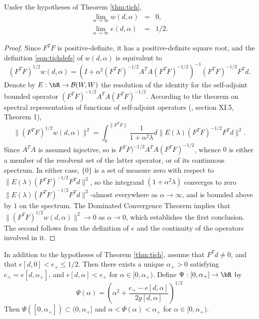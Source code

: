 \begin{proposition}
  \label{thm:alphainf}
  Under the hypotheses of Theorem \ref{thm:tich}, 
  \begin{eqnarray}
  \label{eqn:walphainf}
  \lim_{\alpha \rightarrow \infty} w(d,\alpha) & = & 0,\\
  \label{eqn:ealphainf} 
  \lim_{\alpha \rightarrow \infty} e(d,\alpha) & = & 1/2.
  \end{eqnarray}
\end{proposition}
\begin{proof}
  Since $F^TF$ is positive-definite, it has a positive-definite square root, and the definition \ref{eqn:tichdefs} of $w(d,\alpha)$ is equivalent to
  \begin{equation}\label{eqn:ftfw}
  (F^TF)^{1/2}w(d,\alpha) = (I+\alpha^2 (F^TF)^{-1/2}A^TA(F^TF)^{-1/2})^{-1}(F^TF)^{-1/2}F^Td.
  \end{equation}
  Denote by $E:\bR \rightarrow {\cal B}(W,W)$ the resolution of the identity for the self-adjoint bounded operator $(F^TF)^{-1/2}A^TA(F^TF)^{-1/2}$. According to the theorem on spectral representation of functions of self-adjoint operators (\cite{Yosida}, section XI.5, Theorem 1),
  \begin{equation}\label{eqn:specw}
  \|(F^TF)^{1/2}w(d,\alpha)\|^2 = \int_0^{\|F^TF\|}\frac{1}{1+\alpha^2 \lambda}d \|E(\lambda)(F^TF)^{-1/2}F^Td\|^2.
  \end{equation}
  Since $A^TA$ is assumed injective, so is $F^TF)^{-1/2}A^TA(F^TF)^{-1/2}$, whence $0$ is either a member of the resolvent set of the latter operator, or of its continuous spectrum. In either case, $\{0\}$ is a set of measure zero with respect to $\|E(\lambda)(F^TF)^{-1/2}F^Td\|^2$, so the integrand $(1+\alpha^2 \lambda)$ converges to zero $\|E(\lambda)(F^TF)^{-1/2}F^Td\|^2$-almost everywhere as $\alpha \rightarrow \infty$, and is bounded above by $1$ on the spectrum. The Dominated Convergence Theorem implies that $\|(F^TF)^{1/2}w(d,\alpha)\|^2 \rightarrow 0$ as $\alpha \rightarrow 0$, which establishes the first conclusion. The second follows from the definition of $e$ and the continuity of the operators involved in it.
\end{proof}

\begin{proposition}
  \label{thm:psidef}
  In addition to the hypotheses of Theorem \ref{thm:tich}, assume that $F^Td \ne 0$, and that $e[d,0]<e_+ \le 1/2$. Then there exists a unique $\alpha_+ > 0$ satisfying $e_+ = e[d,\alpha_+]$, and $e[d,\alpha]<e_+$ for $\alpha \in [0,\alpha_+)$. Define $\Psi: [0,\alpha_+] \rightarrow \bR$ by
 \begin{equation}
\label{eqn:alphasecant}
\Psi(\alpha)= \left(\alpha^2 + \frac{e_{+}-e[d,\alpha]}{2g[d,\alpha]} \right)^{1/2}
\end{equation} 
Then $\Psi([0,\alpha_+]) \subset (0,\alpha_+]$ and $\alpha<\Psi(\alpha)<\alpha_+$ for $\alpha \in [0,\alpha_+)$. 
\end{proposition}

